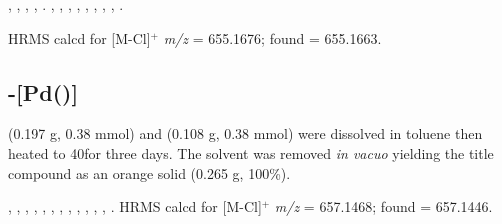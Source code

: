 ,
,
,
,
.
,
,
,
,
,
,
,
,
.

HRMS calcd for  [M-Cl]$^+$ \emph{m/z} = 655.1676; found = 655.1663.


\subsection*{\trans{}-[Pd(\tButhixantphos)]}


\tBuThixantphos{} (0.197 g, 0.38 mmol) and \ce{[Pd(cod)Cl2]} (0.108 g, 0.38 mmol) were dissolved in toluene then heated to 40\degC for three days.  The solvent was removed \emph{in vacuo} yielding the title compound as an orange solid (0.265 g, 100\%).



,
,
,
,
,
,
,
,
,
,
,
,
.
HRMS calcd for  [M-Cl]$^+$ \emph{m/z} = 657.1468; found = 657.1446.

